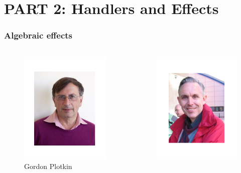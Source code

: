 \section{PART 2: Handlers and Effects}
\begin{frame}
  \frametitle{Algebraic effects}
  \begin{columns}
    \begin{column}{0.5\textwidth}
      \begin{center}
        \begin{figure}
          \includegraphics[scale=0.3]{figures/gordonplotkin.png}
          \caption{Gordon Plotkin}
        \end{figure}
      \end{center}
    \end{column}
    \begin{column}{0.5\textwidth}
      \begin{center}
        \begin{figure}
          \includegraphics[scale=0.3]{figures/johnpower.png}

\end{figure}
\end{center}
\end{column}
\end{columns}
\end{frame}
